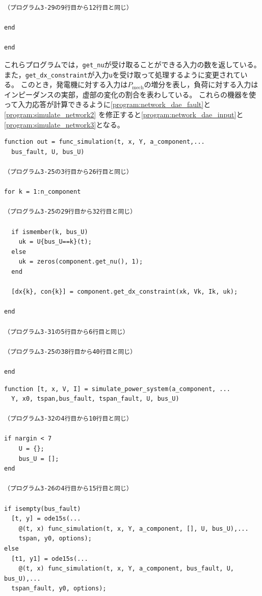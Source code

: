 \documentclass[tombow,dvipdfmx]{corona-a5-1.1}
\begin{document}
\begin{例}
\begin{PROGRAMA}[count,title={load\_impedance.m}]
\begin{verbatim}
（プログラム3-29の9行目から12行目と同じ）

end

end
\end{verbatim}
\end{PROGRAMA}
これらプログラムでは，\verb|get_nu|が受け取ることができる入力の数を返している。
また，\verb|get_dx_constraint|が入力\verb|u|を受け取って処理するように変更されている。
このとき，発電機に対する入力は$P_\mathrm{mech}$の増分を表し，負荷に対する入力は
インピーダンスの実部，虚部の変化の割合を表わしている。
これらの機器を使って入力応答が計算できるように\ref{program:network_dae_fault}と\ref{program:simulate_network2}
を修正すると\ref{program:network_dae_input}と\ref{program:simulate_network3}となる。
\begin{PROGRAMA}[count,title={func\_simulation.m}]\label{program:network_dae_input}
\begin{verbatim}
function out = func_simulation(t, x, Y, a_component,...
  bus_fault, U, bus_U)

（プログラム3-25の3行目から26行目と同じ）

for k = 1:n_component

（プログラム3-25の29行目から32行目と同じ）
  
  if ismember(k, bus_U)
    uk = U{bus_U==k}(t);
  else
    uk = zeros(component.get_nu(), 1);
  end
  
  [dx{k}, con{k}] = component.get_dx_constraint(xk, Vk, Ik, uk);
  
end

（プログラム3-31の5行目から6行目と同じ）

（プログラム3-25の38行目から40行目と同じ）

end
\end{verbatim}
\end{PROGRAMA}

\begin{PROGRAMA}[count,title={simulate\_power\_system.m}]\label{program:simulate_network3}
\begin{verbatim}
function [t, x, V, I] = simulate_power_system(a_component, ...
  Y, x0, tspan,bus_fault, tspan_fault, U, bus_U)

（プログラム3-32の4行目から10行目と同じ）

if nargin < 7
    U = {};
    bus_U = [];
end

（プログラム3-26の4行目から15行目と同じ）

if isempty(bus_fault)
  [t, y] = ode15s(...
    @(t, x) func_simulation(t, x, Y, a_component, [], U, bus_U),...
    tspan, y0, options);
else
  [t1, y1] = ode15s(...
    @(t, x) func_simulation(t, x, Y, a_component, bus_fault, U, bus_U),...
  tspan_fault, y0, options);
  

\end{verbatim}
\end{PROGRAMA}
\end{例}
\end{document}
